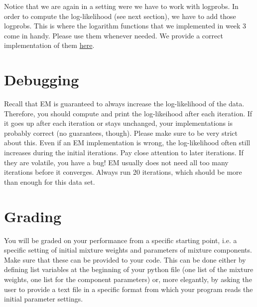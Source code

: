 \documentclass[11pt, leqno, a4paper]{article}
\begin{document}
Notice that we are again in a setting were we have to work with logprobs. In order to compute the log-likelihood (see next section), we have to add those logprobs.
This is where the logarithm functions that we implemented in week 3 come in handy. Please use them whenever needed. We provide a correct implementation of
them \href{https://github.com/BasicProbability/BasicProbability.github.io/raw/master/Homework/Programming/2016-17/Assignment5/logarithms_solution.py}{here}.

\section{Debugging}

Recall that EM is guaranteed to always increase the log-likelihood of the data. Therefore, you should compute and print the log-likeihood after each iteration.
If it goes up after each iteration or stays unchanged, your implementations is probably correct (no guarantees, though). Please make sure to be very strict about
this. Even if an EM implementation is wrong, the log-likelihood often still increases during the initial iterations. Pay close attention to later iterations. If they
are volatile, you have a bug! EM usually does not need all too many iterations before it converges. Always run 20 iterations, which should be more than enough for 
this data set.

\section{Grading}

You will be graded on your performance from a specific starting point, i.e. a specific setting of initial mixture weights and parameters of mixture components.
Make sure that these can be provided to your code. This can be done either by defining list variables at the beginning of your python file (one list of the
mixture weights, one list for the component parameters) or, more elegantly, by asking the user to provide a text file in a specific format from which your program
reads the initial parameter settings.
\end{document}
